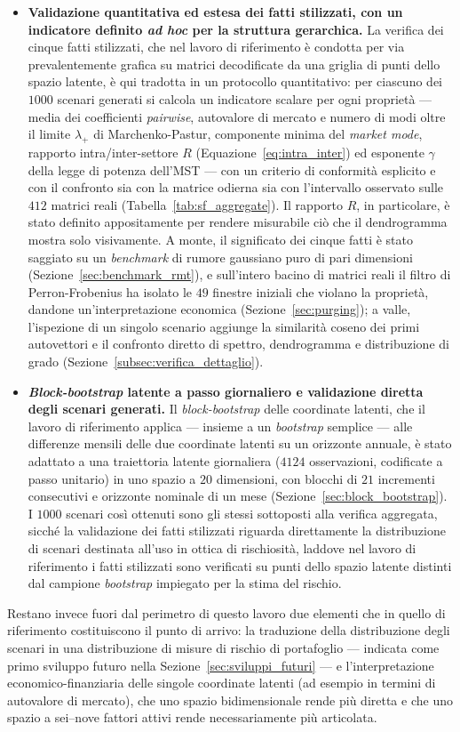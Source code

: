\begin{itemize}
    \item \textbf{Validazione quantitativa ed estesa dei fatti stilizzati, con un indicatore definito \emph{ad hoc} per la struttura gerarchica.} La verifica dei cinque fatti stilizzati, che nel lavoro di riferimento è condotta per via prevalentemente grafica su matrici decodificate da una griglia di punti dello spazio latente, è qui tradotta in un protocollo quantitativo: per ciascuno dei $1000$ scenari generati si calcola un indicatore scalare per ogni proprietà --- media dei coefficienti \emph{pairwise}, autovalore di mercato e numero di modi oltre il limite $\lambda_+$ di Marchenko-Pastur, componente minima del \emph{market mode}, rapporto intra/inter-settore $R$ (Equazione~\ref{eq:intra_inter}) ed esponente $\gamma$ della legge di potenza dell'MST --- con un criterio di conformità esplicito e con il confronto sia con la matrice odierna sia con l'intervallo osservato sulle $412$ matrici reali (Tabella~\ref{tab:sf_aggregate}). Il rapporto $R$, in particolare, è stato definito appositamente per rendere misurabile ciò che il dendrogramma mostra solo visivamente. A monte, il significato dei cinque fatti è stato saggiato su un \emph{benchmark} di rumore gaussiano puro di pari dimensioni (Sezione~\ref{sec:benchmark_rmt}), e sull'intero bacino di matrici reali il filtro di Perron-Frobenius ha isolato le $49$ finestre iniziali che violano la proprietà, dandone un'interpretazione economica (Sezione~\ref{sec:purging}); a valle, l'ispezione di un singolo scenario aggiunge la similarità coseno dei primi autovettori e il confronto diretto di spettro, dendrogramma e distribuzione di grado (Sezione~\ref{subsec:verifica_dettaglio}).
    \item \textbf{\emph{Block-bootstrap} latente a passo giornaliero e validazione diretta degli scenari generati.} Il \emph{block-bootstrap} delle coordinate latenti, che il lavoro di riferimento applica --- insieme a un \emph{bootstrap} semplice --- alle differenze mensili delle due coordinate latenti su un orizzonte annuale, è stato adattato a una traiettoria latente giornaliera ($4124$ osservazioni, codificate a passo unitario) in uno spazio a $20$ dimensioni, con blocchi di $21$ incrementi consecutivi e orizzonte nominale di un mese (Sezione~\ref{sec:block_bootstrap}). I $1000$ scenari così ottenuti sono gli stessi sottoposti alla verifica aggregata, sicché la validazione dei fatti stilizzati riguarda direttamente la distribuzione di scenari destinata all'uso in ottica di rischiosità, laddove nel lavoro di riferimento i fatti stilizzati sono verificati su punti dello spazio latente distinti dal campione \emph{bootstrap} impiegato per la stima del rischio.
\end{itemize}
Restano invece fuori dal perimetro di questo lavoro due elementi che in quello di riferimento costituiscono il punto di arrivo: la traduzione della distribuzione degli scenari in una distribuzione di misure di rischio di portafoglio --- indicata come primo sviluppo futuro nella Sezione~\ref{sec:sviluppi_futuri} --- e l'interpretazione economico-finanziaria delle singole coordinate latenti (ad esempio in termini di autovalore di mercato), che uno spazio bidimensionale rende più diretta e che uno spazio a sei--nove fattori attivi rende necessariamente più articolata.

